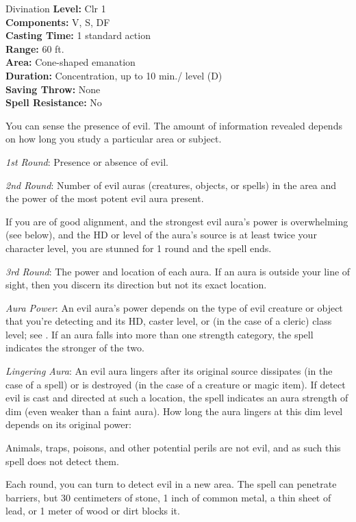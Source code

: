 {Divination}
{
	\textbf{Level:}
	Clr 1\\
	\textbf{Components:}
	V, S, DF\\
	\textbf{Casting Time:}
	1 standard action\\
	\textbf{Range:}
	60 ft.\\
	\textbf{Area:}
	Cone-shaped emanation\\
	\textbf{Duration:}
	Concentration, up to 10 min./ level (D)\\
	\textbf{Saving Throw:}
	None\\
	\textbf{Spell Resistance:}
	No\\
}
{
	You can sense the presence of evil. The amount of information revealed depends on how long you study a particular area or subject.

	\textit{1st Round}:
	Presence or absence of evil.

	\textit{2nd Round}:
	Number of evil auras (creatures, objects, or spells) in the area and the power of the most potent evil aura present.

	If you are of good alignment, and the strongest evil aura's power is overwhelming (see below), and the HD or level of the aura's source is at least twice your character level, you are stunned for 1 round and the spell ends.

	\textit{3rd Round}:
	The power and location of each aura. If an aura is outside your line of sight, then you discern its direction but not its exact location.

	\textit{Aura Power}:
	An evil aura's power depends on the type of evil creature or object that you're detecting and its HD, caster level, or (in the case of a cleric) class level; see . If an aura falls into more than one strength category, the spell indicates the stronger of the two.

	\textit{Lingering Aura}:
	An evil aura lingers after its original source dissipates (in the case of a spell) or is destroyed (in the case of a creature or magic item). If detect evil is cast and directed at such a location, the spell indicates an aura strength of dim (even weaker than a faint aura). How long the aura lingers at this dim level depends on its original power:


	Animals, traps, poisons, and other potential perils are not evil, and as such this spell does not detect them.

	Each round, you can turn to detect evil in a new area. The spell can penetrate barriers, but 30 centimeters of stone, 1 inch of common metal, a thin sheet of lead, or 1 meter of wood or dirt blocks it.

}

